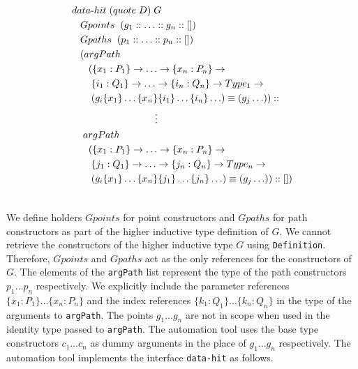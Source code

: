 \documentclass[sigplan,10pt]{acmart}
\begin{document}
\begin{center}
\begingroup
\fontsize{7.9pt}{0pt}\selectfont
\begin{align}
& data{\text -}hit \hspace {0.1cm} (quote \hspace {0.1cm} D) \hspace {0.1cm} G \nonumber \\
  & \hspace {0.3cm} Gpoints \hspace {0.2cm} (g_1 ::  \ldots :: g_n :: []) \nonumber \\
  & \hspace {0.3cm} Gpaths  \hspace {0.2cm} (p_1 :: \ldots :: p_n :: []) \nonumber \\
  & \hspace {0.3cm} (argPath \nonumber \\
  & \hspace {0.6cm} (\{x_1:P_1\} \rightarrow \ldots \rightarrow \{x_n:P_n\} \rightarrow \nonumber \\
  & \hspace {0.7cm} \{i_1:Q_1\} \rightarrow \ldots \rightarrow \{i_n:Q_n\} \rightarrow Type_1 \rightarrow \nonumber \\
  & \hspace {0.7cm} (g_i \{x_1\} \ldots \{x_n\} \{i_1\} \ldots \{i_n\} \ldots) \equiv (g_j \ldots)) :: \nonumber \\
  & \hspace {3cm} \vdots \nonumber \\
  & \hspace {0.4cm} argPath \nonumber \\
  & \hspace {0.6cm} (\{x_1:P_1\} \rightarrow \ldots \rightarrow \{x_n:P_n\} \rightarrow \nonumber \\
  & \hspace {0.7cm} \{j_1:Q_1\} \rightarrow \ldots \rightarrow \{j_n:Q_n\} \rightarrow Type_n \rightarrow \nonumber \\
  & \hspace {0.7cm} (g_i \{x_1\} \ldots \{x_n\} \{j_1\} \ldots \{j_n\} \ldots) \equiv (g_j \ldots)) :: [])\nonumber \\ \nonumber
\end{align}
\endgroup
\end{center}
\normalsize

We define holders $Gpoints$ for point constructors and $Gpaths$ for path constructors as part of the higher inductive type definition of $G$. We cannot retrieve the constructors of the higher inductive type $G$ using {\tt Definition}. Therefore, $Gpoints$ and $Gpaths$ act as the only references for the constructors of $G$. The elements of the {\tt argPath} list represent the type of the path constructors $p_1 \ldots p_n$ respectively. We explicitly include the parameter references $\{x_1 : P_1\} \ldots \{x_n : P_n\}$ and the index references $\{k_1 : Q_1\} \ldots \{k_n : Q_n\}$ in the type of the arguments to {\tt argPath}. The points $g_1 \ldots g_n$ are not in scope when used in the identity type passed to {\tt argPath}. The automation tool uses the base type constructors $c_1 \ldots c_n$ as dummy arguments in the place of $g_1 \ldots g_n$ respectively. The automation tool implements the interface {\tt data-hit} as follows.
\end{document}
